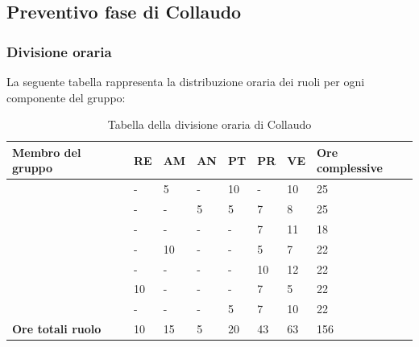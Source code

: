 \subsection{Preventivo fase di Collaudo}

\subsubsection{Divisione oraria}
La seguente tabella rappresenta la distribuzione oraria dei ruoli per ogni componente del gruppo:
{

\renewcommand{\arraystretch}{2}
\begin{longtable}[h!] { C{3.5cm} C{1cm} C{1cm} C{1cm} C{1cm} C{1cm} C{1cm} C{2cm}}
\caption{Tabella della divisione oraria di Collaudo}	\\
\rowcolor{\primaryColor}

\textcolor{\secondaryColor}{\textbf{Membro del gruppo}} & 
\textcolor{\secondaryColor}{\textbf{RE}} & 
\textcolor{\secondaryColor}{\textbf{AM}} & 
\textcolor{\secondaryColor}{\textbf{AN}} & 
\textcolor{\secondaryColor}{\textbf{PT}} & 
\textcolor{\secondaryColor}{\textbf{PR}} & 
\textcolor{\secondaryColor}{\textbf{VE}} & 
\textcolor{\secondaryColor}{\textbf{Ore complessive}}\\	
\endhead

\AW{}                     &  - &  5 &  - & 10 & - & 10 & 25 \\
\AT{}                     &  - &  - &  5 & 5 & 7 & 8 & 25 \\
\AD{}                     &  - &  - &  - & - & 7 & 11 & 18 \\
\EC{}                     &  - &  10 &  - & - & 5 & 7 & 22 \\
\EM{}                     &  - &  - &  - & - & 10 & 12 & 22 \\
\FP{}                     & 10 & - &  - & - & 7 & 5 & 22 \\
\GG{}                     &  - &  - &  - & 5 & 7 & 10 & 22 \\
\textbf{Ore totali ruolo} & 10 & 15 & 5 & 20 & 43 & 63 & 156 \\

\end{longtable}
}


